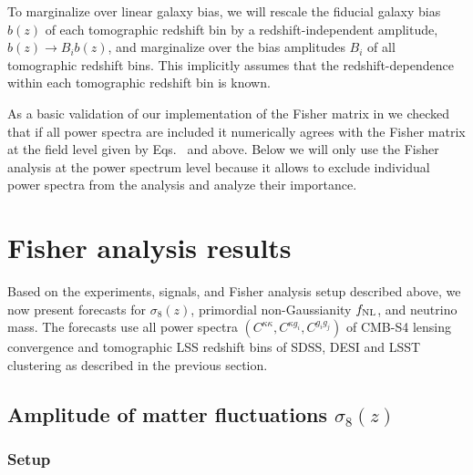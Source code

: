 \documentclass[prd,superscriptaddress,floatfix,notitlepage,nofootinbib,reprint]{revtex4-1} %
\begin{document}
To marginalize over linear galaxy bias,
we will rescale the fiducial galaxy bias $b(z)$ of each tomographic redshift bin by a redshift-independent amplitude, $b(z)\rightarrow B_ib(z)$, and marginalize over the bias amplitudes $B_i$ of all tomographic redshift bins.
This implicitly assumes that the redshift-dependence within each tomographic redshift bin is known.





As a basic validation of our implementation of the Fisher matrix in  we checked that if all power spectra are included it numerically agrees with the Fisher matrix at the field level given by Eqs.~ and  above.
Below we will only use the Fisher analysis at the power spectrum level   because it allows to exclude individual power spectra from the analysis and analyze their importance. 





\section{Fisher analysis results}
\label{se:FisherResults}

Based on the experiments, signals, and Fisher analysis setup described above, we now present forecasts for $\sigma_8(z)$, primordial non-Gaussianity ${f_\mathrm{NL}}$, and neutrino mass.
The forecasts use all power spectra $(C^{\kappa\kappa},C^{\kappa g_i},C^{g_ig_j})$ of CMB-S4 lensing convergence and tomographic LSS redshift bins  of SDSS, DESI and LSST clustering as described in the previous section.



\subsection{Amplitude of matter fluctuations \texorpdfstring{$\sigma_8(z)$}{sigma8(z)}}
\label{se:sigma8Results}

\subsubsection{Setup}
\end{document}
